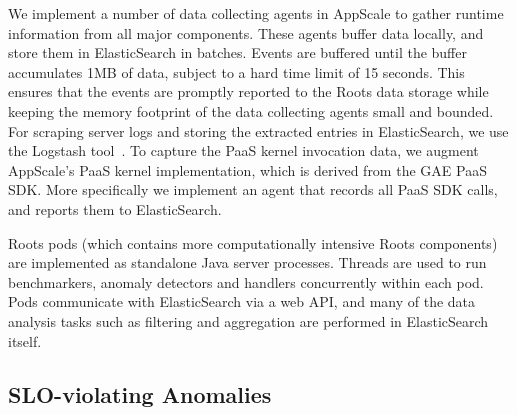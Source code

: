 We implement a number of data collecting agents in AppScale to gather runtime information
from all major components. These agents buffer data locally, and store them in ElasticSearch
in batches. Events are buffered until the buffer accumulates 1MB of data, subject to a hard time limit of 
15 seconds. This ensures that the events are promptly reported to the Roots data
storage while keeping the memory footprint of the data collecting agents small and bounded. 
For scraping server logs and storing the extracted entries in ElasticSearch,
we use the Logstash tool~\cite{logstash}. 
To capture the PaaS kernel invocation data, we augment AppScale's PaaS kernel implementation,
which is derived from the GAE PaaS SDK. More specifically we implement an agent that records
all PaaS SDK calls, and reports them to ElasticSearch. 

Roots pods (which  contains more computationally intensive Roots components) are implemented 
as standalone Java server processes. Threads are used to run benchmarkers,
anomaly detectors and handlers concurrently within each pod. Pods communicate with ElasticSearch via
a web API, and many of the data analysis tasks such as filtering and aggregation are performed
in ElasticSearch itself. 

\subsection{SLO-violating Anomalies}

